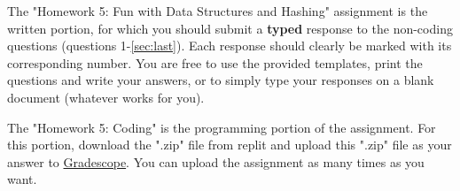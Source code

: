 \documentclass [12pt]{article}
\begin{document}
The "Homework 5: Fun with Data Structures and Hashing" assignment is the written portion, for which you should submit a \textbf{typed} response to the non-coding questions (questions 1-\ref{sec:last}). Each response should clearly be marked with its corresponding number. You are free to use the provided templates, print the questions and write your answers, or to simply type your responses on a blank document (whatever works for you).

The "Homework 5: Coding" is the programming portion of the assignment. For this portion, download the ".zip" file from replit and upload this ".zip" file as your answer to \href{https://www.gradescope.com/courses/350304}{Gradescope}. You can upload the assignment as many times as you want.
\end{document}
